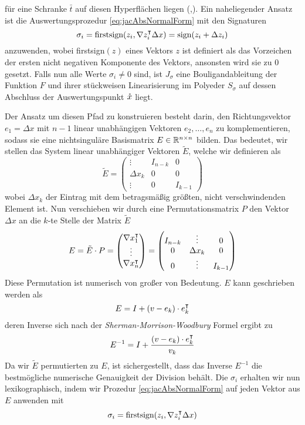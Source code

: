 für eine Schranke $\bar t$ auf diesen Hyperflächen liegen (\cite[Proposition 6]{monster},\cite[S.11]{plan}). 
Ein naheliegender Ansatz ist die Auswertungsprozedur \eqref{eq:jacAbsNormalForm} mit den Signaturen
\[
 \sigma_i = \text{firstsign}(z_i,\nabla z_i^\intercal\Delta x) = \text{sign}(z_i+\Delta z_i)
\]
anzuwenden, wobei firstsign$(z)$ eines Vektors $z$ ist definiert als das Vorzeichen der ersten nicht negativen Komponente des Vektors, ansonsten wird sie zu $0$ gesetzt. Falls nun alle Werte $\sigma_i \neq 0$ sind, ist $J_\sigma$ eine Bouligandableitung der Funktion $F$ und ihrer stückweisen Linearisierung im Polyeder $S_\sigma$ auf dessen Abschluss der Auswertungspunkt $\mathring{x}$ liegt.

Der Ansatz um diesen Pfad zu konstruieren besteht darin, den Richtungsvektor $e_1 = \Delta x$ mit $n-1$ linear unabhängigen Vektoren $e_2,\ldots, e_n$ zu komplementieren, sodass sie eine nichtsinguläre Basismatrix $E\in \mathbb{R}^{n\times n}$ bilden.
Das bedeutet, wir stellen das System linear unabhängiger Vektoren $\tilde E$, welche wir definieren als
\[
\tilde E = 
 \begin{pmatrix}
  \vdots   & I_{n-k} & 0 \\
  \Delta x_k & 0&0\\
  \vdots   & 0&I_{k-1}
 \end{pmatrix}
\]
wobei $\Delta x_k$ der Eintrag mit dem betragsmäßig größten, nicht verschwindenden Element ist. Nun verschieben wir durch eine Permutationsmatrix $P$ den Vektor $\Delta x$ an die $k$-te Stelle der Matrix $\tilde E$
\[
E = \tilde E \cdot P=
\begin{pmatrix}
  \nabla x_1^\intercal\\
  \vdots\\
  \nabla x_n^\intercal\\
 \end{pmatrix}
 =
  \begin{pmatrix}
   I_{n-k} & \vdots &0\\
  0 & \Delta x_k & 0\\
    0 & \vdots&I_{k-1}
 \end{pmatrix}
\]
Diese Permutation ist numerisch von großer von Bedeutung. $E$ kann geschrieben werden als
\[
  E = I + (v-e_k)\cdot e_k^\intercal 
\] 
deren Inverse sich nach der \textit{Sherman-Morrison-Woodbury} Formel ergibt zu
\[
 E^{-1} = I + \frac{(v-e_k)\cdot e_k^\intercal}{v_k}
\]
Da wir $\tilde E$ permutierten zu $E$, ist sichergestellt, dass das Inverse $E^{-1}$ die bestmögliche numerische Genauigkeit der Division behält.
Die $\sigma_i$ erhalten wir nun lexikographisch, indem wir Prozedur \eqref{eq:jacAbsNormalForm} auf jeden Vektor aus $E$ anwenden mit 
\[
  \sigma_i = \text{firstsign}(z_i,\nabla z_i^\intercal\Delta x)
\]

